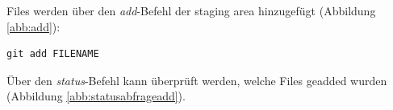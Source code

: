 \documentclass[twoside, 11pr]{article}
\begin{document}
\begin{figure}[!tbph]
\end{figure}

\noindent
Files werden über den \textit{add}-Befehl der staging area hinzugefügt (Abbildung \ref{abb:add}):

\begin{lstlisting}
git add FILENAME
\end{lstlisting}

\begin{figure}[!tbph]
\end{figure}


\noindent
Über den \textit{status}-Befehl kann überprüft werden, welche Files geadded wurden (Abbildung \ref{abb:statusabfrageadd}).
\end{document}
